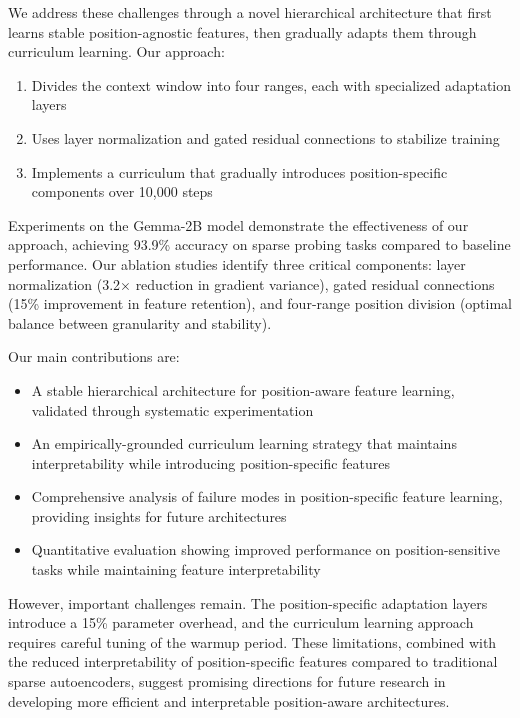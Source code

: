 \documentclass{article} %
\begin{document}
We address these challenges through a novel hierarchical architecture that first learns stable position-agnostic features, then gradually adapts them through curriculum learning. Our approach:
\begin{enumerate}
    \item Divides the context window into four ranges, each with specialized adaptation layers
    \item Uses layer normalization and gated residual connections to stabilize training
    \item Implements a curriculum that gradually introduces position-specific components over 10,000 steps
\end{enumerate}

Experiments on the Gemma-2B model demonstrate the effectiveness of our approach, achieving 93.9\% accuracy on sparse probing tasks compared to baseline performance. Our ablation studies identify three critical components: layer normalization (3.2$\times$ reduction in gradient variance), gated residual connections (15\% improvement in feature retention), and four-range position division (optimal balance between granularity and stability).

Our main contributions are:
\begin{itemize}
    \item A stable hierarchical architecture for position-aware feature learning, validated through systematic experimentation
    \item An empirically-grounded curriculum learning strategy that maintains interpretability while introducing position-specific features
    \item Comprehensive analysis of failure modes in position-specific feature learning, providing insights for future architectures
    \item Quantitative evaluation showing improved performance on position-sensitive tasks while maintaining feature interpretability
\end{itemize}

However, important challenges remain. The position-specific adaptation layers introduce a 15\% parameter overhead, and the curriculum learning approach requires careful tuning of the warmup period. These limitations, combined with the reduced interpretability of position-specific features compared to traditional sparse autoencoders, suggest promising directions for future research in developing more efficient and interpretable position-aware architectures.
\end{document}
